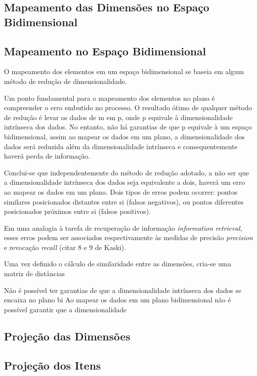 \subsection{Mapeamento das Dimensões no Espaço Bidimensional}
\subsection{Mapeamento no Espaço Bidimensional}

O mapeamento dos elementos em um espaço bidimensional se baseia em algum método de redução de dimensionalidade. 

Um ponto fundamental para o mapeamento dos elementos no plano é compreender o erro embutido no processo. O resultado ótimo de qualquer método de redução é levar os dados de m em p, onde p equivale à dimensionalidade intrínseca dos dados. No entanto,  não há garantias de que p equivale à um espaço bidimensional, assim ao mapear os dados em um plano, a dimensionalidade dos dados será reduzida além da dimensionalidade intrínseca e consequentemente haverá perda de informação.

Conclui-se que independentemente do método de redução adotado, a não ser que a dimensionalidade intrínseca dos dados seja equivalente a dois, haverá um erro ao mapear os dados em um plano. Dois tipos de erros podem ocorrer: pontos similares posicionados distantes entre si (falsos negativos), ou pontos diferentes posicionados próximos entre si (falsos positivos). 

Em uma analogia à tarefa de recuperação de informação \emph{information retrieval}, esses erros podem ser associados respectivamente às medidas de precisão \emph{precision} e revocação \emph{recall} (citar 8 e 9 de Kaski).

Uma vez definido o cálculo de similaridade entre as dimensões, cria-se uma matriz de distâncias 

Não é possível ter garantias de que a dimensionalidade intrínseca dos dados se encaixa no plano bi
Ao mapear os dados em um plano bidimensional não é possível garantir que a dimensionalidade  

\subsection{Projeção das Dimensões}

\subsection{Projeção dos Itens}

